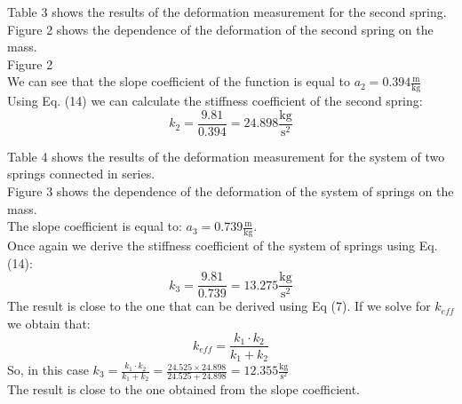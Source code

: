 \documentclass{article}
\begin{document}
Table 3 shows the results of the deformation measurement for the second spring. \\ 

Figure 2 shows the dependence of the deformation of the second spring on the mass. \\
Figure 2 \\
We can see that the slope coefficient of the function is equal to \(a_2 = 0.394 \mathrm{\frac{m}{kg}}\) \\ 
Using Eq. (14) we can calculate the stiffness coefficient of the second spring: \\
\begin{equation}
    k_2 = \frac{9.81}{0.394} = 24.898 \mathrm{\frac{kg}{s^2}}
\end{equation}


Table 4 shows the results of the deformation measurement for the system of two springs connected in series. \\
Figure 3 shows the dependence of the deformation of the system of springs on the mass. \\ 
The slope coefficient is equal to: \(a_3 = 0.739 \mathrm{\frac{m}{kg}}\). \\
Once again we derive the stiffness coefficient of the system of springs using Eq. (14): \\ 
\begin{equation}
    k_3 = \frac{9.81}{0.739}  = 13.275 \mathrm{\frac{kg}{s^2}}
\end{equation}
The result is close to the one that can be derived using Eq (7). If we solve for \(k_{eff}\) we obtain that:
\begin{equation}
    k_{eff} = \frac{k_1 \cdot k_2}{k_1 + k_2}
\end{equation}
So, in this case \(k_3 = \frac{k_1 \cdot k_2}{k_1 + k_2} = \frac{24.525 \times 24.898}{24.525+24.898} = 12.355 \mathrm{\frac{kg}{s^2}}\) \\
The result is close to the one obtained from the slope coefficient.
\end{document}
